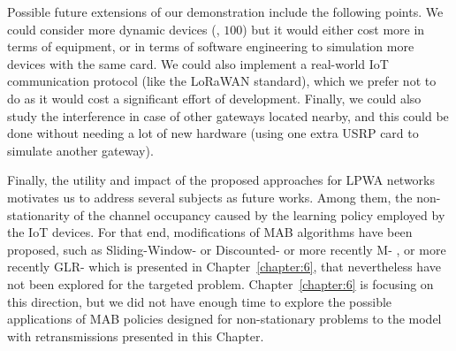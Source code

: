 

Possible future extensions of our demonstration include the following points.
We could consider more dynamic devices (\eg, $100$) but it would either cost more in terms of equipment, or in terms of software engineering to simulation more devices with the same card.
We could also implement a real-world IoT communication protocol (like the LoRaWAN standard), which we prefer not to do as it would cost a significant effort of development.
Finally, we could also study the interference in case of other gateways located nearby, and this could be done without needing a lot of new hardware (using one extra USRP card to simulate another gateway).
%



Finally, the utility and impact of the proposed approaches for LPWA networks motivates us to address several subjects as future works. Among them, the non-stationarity of the channel occupancy caused by the learning policy employed by the IoT devices.
%
For that end, modifications of MAB algorithms have been proposed, such as Sliding-Window-\UCB{} or Discounted-\UCB{} \cite{Garivier11UCBDiscount}
or more recently M-\UCB{} \cite{CaoZhenKvetonXie18},
or more recently GLR-\UCB{} \cite{Besson2019GLRT} which is presented in Chapter~\ref{chapter:6},
that nevertheless have not been explored for the targeted problem.
Chapter~\ref{chapter:6} is focusing on this direction, but we did not have enough time to explore the possible applications of MAB policies designed for non-stationary problems to the model with retransmissions presented in this Chapter.

